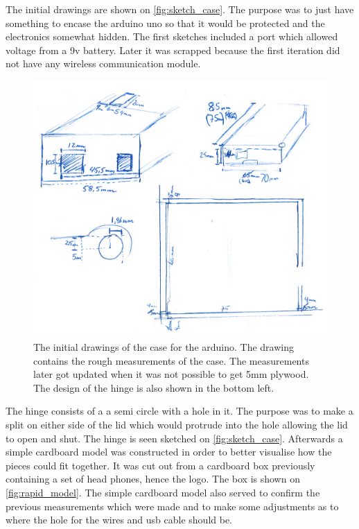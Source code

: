 \noindent
The initial drawings are shown on \autoref{fig:sketch_case}. The purpose was to just have something to encase the arduino uno so that it would be protected and the electronics somewhat hidden. The first sketches included a port which allowed voltage from a 9v battery. Later it was scrapped because the first iteration did not have any wireless communication module.
\begin{figure}[htb]
\centering
\includegraphics[width = \textwidth]{Figure/sketch_case.png}
\caption{The initial drawings of the case for the arduino. The drawing contains the rough measurements of the case. The measurements later got updated when it was not possible to get 5mm plywood. The design of the hinge is also shown in the bottom left.}
\label{fig:sketch_case}
\end{figure}

The hinge consists of a a semi circle with a hole in it. The purpose was to make a split on either side of the lid which would protrude into the hole allowing the lid to open and shut. The hinge is seen sketched on \autoref{fig:sketch_case}. 
\noindent
Afterwards a simple cardboard model was constructed in order to better visualise how the pieces could fit together. It was cut out from a cardboard box previously containing a set of head phones, hence the logo. The box is shown on \autoref{fig:rapid_model}. The simple cardboard model also served to confirm the previous measurements which were made and to make some adjustments as to where the hole for the wires and usb cable should be.


